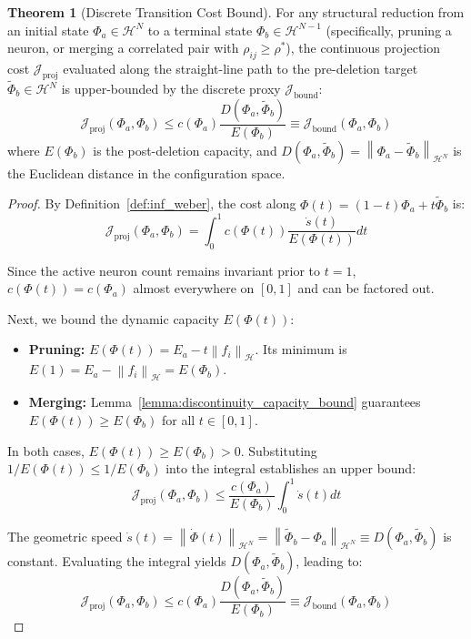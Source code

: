 \documentclass[11pt, a4paper, copyright, gdm]{google}
\newcommand{\norm}[1]{\left\lVert#1\right\rVert}
\newcommand{\calH}{\mathcal{H}}
\newcommand{\calJ}{\mathcal{J}}
\theoremstyle{definition}
\newtheorem{theorem}{Theorem}[section]
\begin{document}
\begin{theorem}[Discrete Transition Cost Bound]
\label{thm:discrete_subspace}
For any structural reduction from an initial state $\Phi_a \in \calH^N$ to a terminal state $\Phi_b \in \calH^{N-1}$ (specifically, pruning a neuron, or merging a correlated pair with $\rho_{ij} \ge \rho^*$), the continuous projection cost $\calJ_{\text{proj}}$ evaluated along the straight-line path to the pre-deletion target $\tilde{\Phi}_b \in \calH^N$ is upper-bounded by the discrete proxy $\calJ_{\text{bound}}$:
\begin{equation}
    \calJ_{\text{proj}}(\Phi_a , \Phi_b) \le c(\Phi_a) \frac{D(\Phi_a, \tilde{\Phi}_b)}{E(\Phi_b)} \equiv \calJ_{\text{bound}}(\Phi_a , \Phi_b)
\end{equation}
where $E(\Phi_b)$ is the post-deletion capacity, and $D(\Phi_a, \tilde{\Phi}_b) = \norm{\Phi_a - \tilde{\Phi}_b}_{\calH^N}$ is the Euclidean distance in the configuration space.
\end{theorem}

\begin{proof}
By Definition~\ref{def:inf_weber}, the cost along $\Phi(t) = (1-t)\Phi_a + t \tilde{\Phi}_b$ is:
\begin{equation*}
    \calJ_{\text{proj}}(\Phi_a, \Phi_b) = \int_0^1 c(\Phi(t)) \frac{\dot{s}(t)}{E(\Phi(t))} dt
\end{equation*}

Since the active neuron count remains invariant prior to $t=1$, $c(\Phi(t)) = c(\Phi_a)$ almost everywhere on $[0,1]$ and can be factored out. 

Next, we bound the dynamic capacity $E(\Phi(t))$:
\begin{itemize}
    \item \textbf{Pruning:} $E(\Phi(t)) = E_a - t\norm{f_i}_\calH$. Its minimum is $E(1) = E_a - \norm{f_i}_\calH = E(\Phi_b)$.
    \item \textbf{Merging:} Lemma~\ref{lemma:discontinuity_capacity_bound} guarantees $E(\Phi(t)) \ge E(\Phi_b)$ for all $t \in [0,1]$.
\end{itemize}
In both cases, $E(\Phi(t)) \ge E(\Phi_b) > 0$. Substituting $1/E(\Phi(t)) \le 1/E(\Phi_b)$ into the integral establishes an upper bound:
\begin{equation} \label{eq:cost_inequality}
    \calJ_{\text{proj}}(\Phi_a, \Phi_b) \le \frac{c(\Phi_a)}{E(\Phi_b)} \int_0^1 \dot{s}(t) dt
\end{equation}

The geometric speed $\dot{s}(t) = \norm{\dot{\Phi}(t)}_{\calH^N} = \norm{\tilde{\Phi}_b - \Phi_a}_{\calH^N} \equiv D(\Phi_a, \tilde{\Phi}_b)$ is constant. Evaluating the integral yields $D(\Phi_a, \tilde{\Phi}_b)$, leading to:
\begin{equation*}
    \calJ_{\text{proj}}(\Phi_a, \Phi_b) \le c(\Phi_a) \frac{D(\Phi_a, \tilde{\Phi}_b)}{E(\Phi_b)} \equiv \calJ_{\text{bound}}(\Phi_a , \Phi_b)
\end{equation*}
\end{proof}
\end{document}
